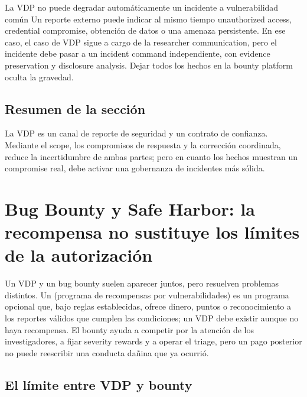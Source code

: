 \documentclass[a4paper]{article}
\begin{document}

\begin{warningbox}{La VDP no puede degradar automáticamente un incidente a vulnerabilidad común}
Un reporte externo puede indicar al mismo tiempo unauthorized access, credential compromise, obtención de datos o una amenaza persistente. En ese caso, el caso de VDP sigue a cargo de la researcher communication, pero el incidente debe pasar a un incident command independiente, con evidence preservation y disclosure analysis. Dejar todos los hechos en la bounty platform oculta la gravedad.
\end{warningbox}

\subsection{Resumen de la sección}

La VDP es un canal de reporte de seguridad y un contrato de confianza. Mediante el scope, los compromisos de respuesta y la corrección coordinada, reduce la incertidumbre de ambas partes; pero en cuanto los hechos muestran un compromise real, debe activar una gobernanza de incidentes más sólida.
\section{Bug Bounty y Safe Harbor: la recompensa no sustituye los límites de la autorización}

Un VDP y un bug bounty suelen aparecer juntos, pero resuelven problemas distintos. Un  (programa de recompensas por vulnerabilidades) es un programa opcional que, bajo reglas establecidas, ofrece dinero, puntos o reconocimiento a los reportes válidos que cumplen las condiciones; un VDP debe existir aunque no haya recompensa. El bounty ayuda a competir por la atención de los investigadores, a fijar severity rewards y a operar el triage, pero un pago posterior no puede reescribir una conducta dañina que ya ocurrió.

\subsection{El límite entre VDP y bounty}
\end{document}
